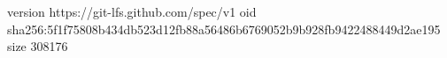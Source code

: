 version https://git-lfs.github.com/spec/v1
oid sha256:5f1f75808b434db523d12fb88a56486b6769052b9b928fb9422488449d2ae195
size 308176
